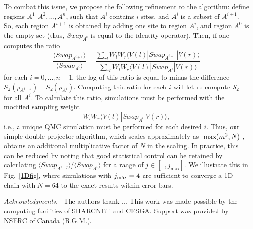 \documentclass[prl,aps,twocolumn,floatfix,amsmath,amssymb,superscriptaddress,tightenlines]{revtex4}
\begin{document}
To combat this issue, we propose the following refinement to the algorithm: define regions $A^1,A^2,...,A^n$, such
that $A^i$ contains $i$ sites, and $A^i$ is a subset of $A^{i+1}$.  So, each region $A^{i+1}$ is obtained by adding one site to region
$A^{i}$, and region $A^0$ is the empty set (thus, $Swap_{A^0}$ is equal to the identity operator).
Then, if one computes the ratio
\begin{equation}
\frac{\langle Swap_{A^{i+1}}\rangle}{\langle Swap_{A^{i}}\rangle}
= \frac{\sum_{rl} W_l W_r \langle V(l) | Swap_{A^{i+1}} | V(r) \rangle} {\sum_{rl} W_l W_r \langle V(l) | Swap_{A^i} | V(r) \rangle}
\end{equation}
for each $i=0,...,n-1$, the log of this ratio is equal to minus the
difference $S_2(\rho_{A^{i+1}})-S_2(\rho_{A^{i}})$.
Computing this ratio for each $i$ will let us compute $S_2$ for all $A^i$.  To calculate this ratio, simulations must be performed 
with the modified sampling weight
\begin{equation}
W_l W_r \langle V(l) | Swap_{A^i} | V(r) \rangle,
\end{equation}
i.e., a unique QMC simulation must be performed for each desired $i$.  Thus, our simple double-projector algorithm, which scales 
approximately as $~{\rm max}(m^2, N)$ \cite{AWSloop}, obtains an additional multiplicative factor of $N$ in the scaling.  In practice, 
this can be reduced by noting that good statistical control can be retained by calculating 
${\langle Swap_{A^{i+j}}\rangle}/{\langle Swap_{A^{i}}\rangle}$ for a range of $j \in [1,j_{\max}]$.  We illustrate this in Fig.~\ref{1Dfig},
where simulations with $j_{\rm max}=4$ are sufficient to converge a 1D chain with $N=64$ to the exact results within error bars.

{\it Acknowledgments.}-- The authors thank ...
This work was made possible by the
computing facilities of SHARCNET and CESGA.  Support was provided by NSERC
of Canada (R.G.M.).


\end{document}
